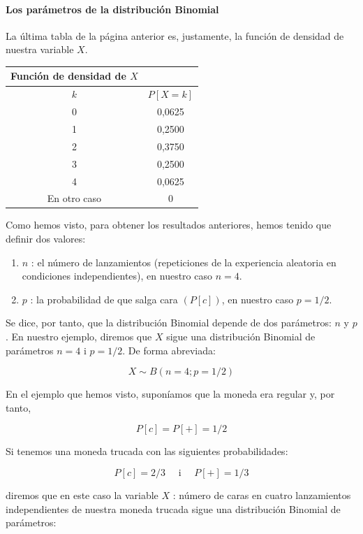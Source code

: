 \documentclass[
]{article}
\providecommand{\tightlist}{%
  \setlength{\itemsep}{0pt}\setlength{\parskip}{0pt}}
\begin{document}
\paragraph{Los parámetros de la distribución Binomial}\label{los-paruxe1metros-de-la-distribuciuxf3n-binomial}

La última tabla de la página anterior es, justamente, la función de densidad de nuestra variable \(X\).

\begin{longtable}[]{@{}cc@{}}
\toprule\noalign{}
Función de densidad de \(X\) & \\
\midrule\noalign{}
\endhead
\bottomrule\noalign{}
\endlastfoot
\(k\) & \(P[X=k]\) \\
0 & 0,0625 \\
1 & 0,2500 \\
2 & 0,3750 \\
3 & 0,2500 \\
4 & 0,0625 \\
En otro caso & 0 \\
\end{longtable}

Como hemos visto, para obtener los resultados anteriores, hemos tenido que definir dos valores:

\begin{enumerate}
\def\labelenumi{\arabic{enumi}.}
\tightlist
\item
  \(n\) : el número de lanzamientos (repeticiones de la experiencia aleatoria en condiciones independientes), en nuestro caso \(n=4\).
\item
  \(p\) : la probabilidad de que salga cara \((P[c])\), en nuestro caso \(p=1 / 2\).
\end{enumerate}

Se dice, por tanto, que la distribución Binomial depende de dos parámetros: \(n\) y \(p\). En nuestro ejemplo, diremos que \(X\) sigue una distribución Binomial de parámetros \(n=4\) i \(p=1 / 2\). De forma abreviada:

\[
X \sim B(n=4 ; p=1 / 2)
\]

En el ejemplo que hemos visto, suponíamos que la moneda era regular y, por tanto,

\[
P[c]=P[+]=1 / 2
\]

Si tenemos una moneda trucada con las siguientes probabilidades:

\[
P[c]=2 / 3 \quad \text { i } \quad P[+]=1 / 3
\]

diremos que en este caso la variable \(X\) : número de caras en cuatro lanzamientos independientes de nuestra moneda trucada sigue una distribución Binomial de parámetros:
\end{document}

